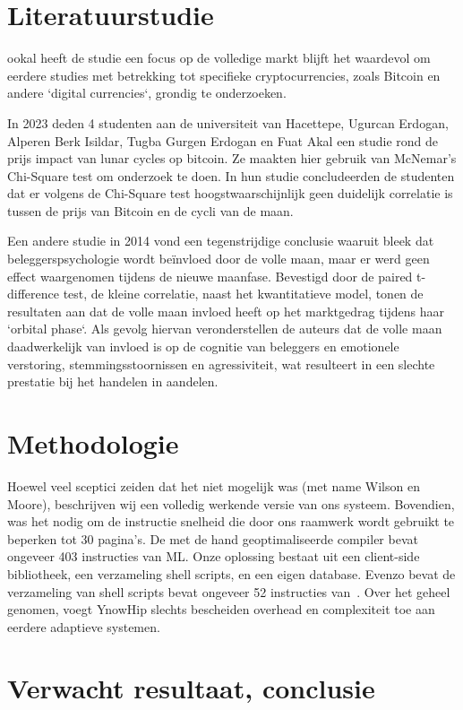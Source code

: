 \documentclass{hogent-article}
\begin{document}
\section{Literatuurstudie}%
\label{sec:Literatuurstudie}

ookal heeft de studie een focus op de volledige markt blijft het waardevol om eerdere studies met betrekking tot specifieke cryptocurrencies, zoals Bitcoin en andere `digital currencies`, grondig te onderzoeken. 

In 2023 deden 4 studenten aan de universiteit van Hacettepe, Ugurcan Erdogan, Alperen Berk Isildar, Tugba Gurgen Erdogan en Fuat Akal \cite{Marquez2023} een studie rond de prijs impact van lunar cycles op bitcoin. Ze maakten hier gebruik van McNemar's Chi-Square test om onderzoek te doen. In hun studie concludeerden de studenten dat er volgens de Chi-Square test hoogstwaarschijnlijk geen duidelijk correlatie is tussen de prijs van Bitcoin en de cycli van de maan.

Een andere studie in 2014 vond een tegenstrijdige conclusie waaruit bleek dat beleggerspsychologie wordt beïnvloed door de volle maan, maar er werd geen effect waargenomen tijdens de nieuwe maanfase. Bevestigd door de paired t-difference test, de kleine correlatie, naast het kwantitatieve model, tonen de resultaten aan dat de volle maan invloed heeft op het marktgedrag tijdens haar `orbital phase`. Als gevolg hiervan veronderstellen de auteurs dat de volle maan daadwerkelijk van invloed is op de cognitie van beleggers en emotionele verstoring, stemmingsstoornissen en agressiviteit, wat resulteert in een slechte prestatie bij het handelen in aandelen.
\textcite{Brahmana2014}

\section{Methodologie}%
\label{sec:Methodologie}

Hoewel veel sceptici zeiden dat het niet mogelijk was (met name Wilson en Moore), beschrijven wij een volledig werkende versie van ons systeem. Bovendien, was het nodig om de instructie snelheid die door ons raamwerk wordt gebruikt te beperken tot 30 pagina's. De met de hand geoptimaliseerde compiler bevat ongeveer 403 instructies van ML. Onze oplossing bestaat uit een client-side bibliotheek, een verzameling shell scripts, en een eigen database. Evenzo bevat de verzameling van shell scripts bevat ongeveer 52 instructies van~\textcite{SabiEtAl2016}. Over het geheel genomen, voegt YnowHip slechts bescheiden overhead en complexiteit toe aan eerdere adaptieve systemen.

\section{Verwacht resultaat, conclusie}%
\label{sec:Resultaat-en-conclusie}


\printbibliography[heading=bibintoc]
\end{document}

